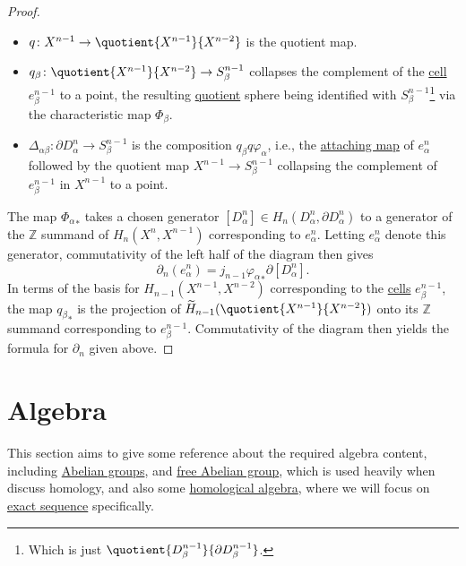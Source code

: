 \begin{proof}
\begin{itemize}
		\item \(q\colon X^{n-1} \to \quotient{X^{n-1} }{X^{n-2} } \) is the quotient map.
		\item \(q_\beta \colon \quotient{X^{n-1} }{X^{n-2} } \to S^{n-1}_\beta\) collapses the complement of the \hyperref[def:cell]{cell} \(e^{n-1}_\beta\) to a point, the resulting
		      \hyperref[CW-complex-quotient]{quotient} sphere being identified with \(S^{n-1}_\beta\)\footnote{Which is just \(\quotient{D^{n-1}_\beta}{\partial D^{n-1}_\beta}\).}
		      via the characteristic map \(\Phi _\beta \).
		\item \(\Delta _{\alpha \beta }\colon \partial D^n_\alpha \to S^{n-1}_\beta\) is the composition \(q_\beta q \varphi _\alpha \), i.e., the
		      \hyperref[def:attaching-map]{attaching map} of \(e^n_\alpha \) followed by the quotient map \(X^{n-1}\to S^{n-1}_\beta\) collapsing the complement of \(e^{n-1}_\beta\)
		      in \(X^{n-1}\) to a point.
	\end{itemize}

	The map \({\Phi _\alpha }_\ast\) takes a chosen generator \([D^n_\alpha ]\in H_n(D^n_\alpha , \partial D^n_\alpha )\) to a generator of the \(\mathbb{Z} \)
	summand of \(H_n(X^n, X^{n-1})\) corresponding to \(e^n_\alpha \). Letting \(e^n_\alpha \) denote this generator, commutativity of the left half
	of the diagram then gives
	\[
		\partial _n(e^n_\alpha )= j_{n-1}{\varphi _\alpha }_\ast\partial [D^n_\alpha ].
	\]
	In terms of the basis for \(H_{n-1}(X^{n-1}, X^{n-2} )\) corresponding to the \hyperref[def:cell]{cells} \(e^{n-1}_\beta\), the map
	\({q_\beta }_\ast\) is the projection of \(\widetilde{H} _{n-1}(\quotient{X^{n-1} }{X^{n-2}})\) onto its \(\mathbb{Z} \)
	summand corresponding to \(e^{n-1}_\beta\). Commutativity of the diagram then yields the formula for \(\partial _n\) given above.
\end{proof}

\chapter{Algebra}
This section aims to give some reference about the required algebra content, including \hyperref[def:Abelian-group]{Abelian groups}, and
\hyperref[def:free-Abelian-group]{free Abelian group}, which is used heavily when discuss homology, and also some \hyperref[sec:homological-algebra]{homological algebra},
where we will focus on \hyperref[def:exact-sequence]{exact sequence} specifically.
